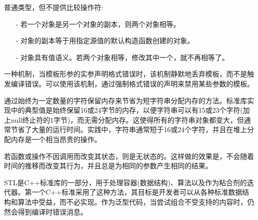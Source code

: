 



普通类型，但不提供比较操作符:

\begin{itemize}
\item [-]
若一个对象是另一个对象的副本，则两个对象相等。

\item [-]
对象的副本等于用指定源值的默认构造函数创建的对象。

\item [-]
对象具有值语义。若两个对象相等，修改其中一个，就不再相等了。
\end{itemize}


一种机制，当模板形参的实参声明格式错误时，该机制静默地丢弃模板，而不是触发编译错误。可以使用该机制，通过强制格式错误的声明来禁用某些参数的模板。


通过始终为一定数量的字符保留内存来节省为短字符串分配内存的方法。标准库实现中的典型值是始终保留16或24字节的内存，以便字符串可以有15或23个字符(加上null终止符的1字节)，而无需分配内存。这使得所有的字符串对象都变大，但通常节省了大量的运行时间。实践中，字符串通常短于16或24个字符，并且在堆上分配内存是一个相当昂贵的操作。


若函数或操作不因调用而改变其状态，则是无状态的。这样做的效果是，不会随着时间的推移而改变其行为，并且总是为相同的参数产生相同的结果。


STL是C++标准库的一部分，用于处理容器(数据结构)、算法以及作为粘合剂的迭代器。第一个C++标准采用了这种方法，其目标是开发者可以从各种标准数据结构和算法中受益，而不必实现。作为泛型代码，当尝试组合不受支持的内容时，仍然会得到编译时错误消息。



